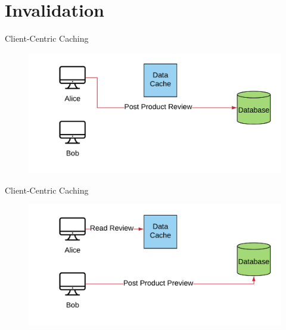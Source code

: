 \documentclass[12pt]{beamer}
\begin{document}
\section{Invalidation}

\begin{frame}[fragile]{Client-Centric Caching}
    \begin{figure}
        \hspace*{-1cm}
        \includegraphics[scale=0.19]{apollo_client_sessions_simplified}
    \end{figure}
    \bigskip
    \medskip
    \smallskip
    \bigskip
    \medskip
    \smallskip
\end{frame}

\begin{frame}[fragile]{Client-Centric Caching}
    \begin{figure}
        \hspace*{-1cm}
        \includegraphics[scale=0.19]{apollo_client_sessions_simplified_2}
    \end{figure}
    \begin{itemize}
    \end{itemize}
\end{frame}
\end{document}
